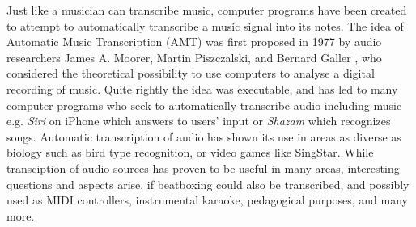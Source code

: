 
Just like a musician can transcribe music, computer programs have been created to attempt to automatically transcribe a music signal into its notes. The idea of Automatic Music Transcription (AMT) was first proposed in 1977 by audio researchers James A. Moorer, Martin Piszczalski, and Bernard Galler \citep{Scheirer1998}, who considered the theoretical possibility to use computers to analyse a digital recording of music. Quite rightly the idea was executable, and has led to many computer programs who seek to automatically transcribe audio including music e.g. \textit{ Siri } on iPhone which answers to users' input or \textit{ Shazam } which recognizes songs. 
Automatic transcription of audio has shown its use in areas as diverse as biology such as bird type recognition, or video games like SingStar.
While transciption of audio sources has proven to be useful in many areas, interesting questions and aspects arise, if beatboxing could also be transcribed, and possibly used as MIDI controllers, instrumental karaoke, pedagogical purposes, and many more.




